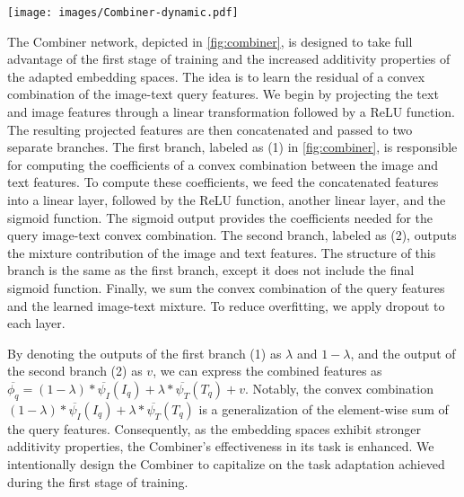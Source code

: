 \documentclass[acmlarge]{acmart}
\begin{document}
\begin{figure*}[tb]
    \centering
    \texttt{[image: images/Combiner-dynamic.pdf]}
    \caption{Architecture of the Combiner network $C_{\theta}$. It takes as input the multimodal query features and outputs a unified representation. $\sigma$ represents the sigmoid function. We denote the outputs of the first branch (1) as $\lambda$ and $1 -\lambda$, while the output of the second branch (2) as $v$. The combined features are $\overline{\phi_q} = (1 - \lambda)* \overline{\psi_{I}}(I_q) + \lambda * \overline{\psi_{T}}(T_q) + v$}
    \label{fig:combiner}
\end{figure*}

The Combiner network, depicted in \cref{fig:combiner}, is designed to take full advantage of the first stage of training and the increased additivity properties of the adapted embedding spaces. The idea is to learn the residual of a convex combination of the image-text query features.
We begin by projecting the text and image features through a linear transformation followed by a ReLU function. The resulting projected features are then concatenated and passed to two separate branches. The first branch, labeled as (1) in \cref{fig:combiner}, is responsible for computing the coefficients of a convex combination between the image and text features.
To compute these coefficients, we feed the concatenated features into a linear layer, followed by the ReLU function, another linear layer, and the sigmoid function. The sigmoid output provides the coefficients needed for the query image-text convex combination.
The second branch, labeled as (2), outputs the mixture contribution of the image and text features. The structure of this branch is the same as the first branch, except it does not include the final sigmoid function.
Finally, we sum the convex combination of the query features and the learned image-text mixture. To reduce overfitting, we apply dropout to each layer.

By denoting the outputs of the first branch (1) as $\lambda$ and $1 -\lambda$, and the output of the second branch (2) as $v$, we can express the combined features as $\overline{\phi_q} = (1 - \lambda)* \overline{\psi_{I}}(I_q) + \lambda * \overline{\psi_{T}}(T_q) + v$. Notably, the convex combination $(1 - \lambda)* \overline{\psi_{I}}(I_q) + \lambda * \overline{\psi_{T}}(T_q)$ is a generalization of the element-wise sum of the query features. Consequently, as the embedding spaces exhibit stronger additivity properties, the Combiner's effectiveness in its task is enhanced. We intentionally design the Combiner to capitalize on the task adaptation achieved during the first stage of training.
\end{document}
